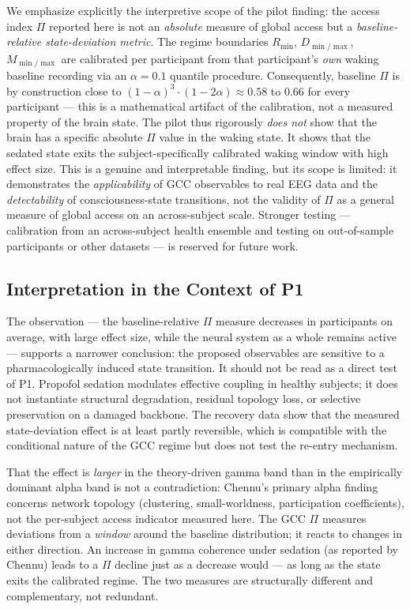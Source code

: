 ﻿\documentclass[11pt,a4paper]{article}
\theoremstyle{plain}
\theoremstyle{definition}
\theoremstyle{remark}
\begin{document}
We emphasize explicitly the interpretive scope of the pilot finding: the access index $\Pi$ reported here is not an \emph{absolute} measure of global access but a \emph{baseline-relative state-deviation metric}. The regime boundaries $R_{\min}$, $D_{\min/\max}$, $M_{\min/\max}$ are calibrated per participant from that participant's \emph{own} waking baseline recording via an $\alpha = 0.1$ quantile procedure. Consequently, baseline $\Pi$ is by construction close to $(1-\alpha)^3 \cdot (1-2\alpha) \approx 0.58$ to $0.66$ for every participant --- this is a mathematical artifact of the calibration, not a measured property of the brain state. The pilot thus rigorously \emph{does not} show that the brain has a specific absolute $\Pi$ value in the waking state. It shows that the sedated state exits the subject-specifically calibrated waking window with high effect size. This is a genuine and interpretable finding, but its scope is limited: it demonstrates the \emph{applicability} of GCC observables to real EEG data and the \emph{detectability} of consciousness-state transitions, not the validity of $\Pi$ as a general measure of global access on an across-subject scale. Stronger testing --- calibration from an across-subject health ensemble and testing on out-of-sample participants or other datasets --- is reserved for future work.

\subsection{Interpretation in the Context of P1}

The observation --- the baseline-relative $\Pi$ measure decreases in participants on average, with large effect size, while the neural system as a whole remains active --- supports a narrower conclusion: the proposed observables are sensitive to a pharmacologically induced state transition. It should not be read as a direct test of P1. Propofol sedation modulates effective coupling in healthy subjects; it does not instantiate structural degradation, residual topology loss, or selective preservation on a damaged backbone. The recovery data show that the measured state-deviation effect is at least partly reversible, which is compatible with the conditional nature of the GCC regime but does not test the re-entry mechanism.

That the effect is \emph{larger} in the theory-driven gamma band than in the empirically dominant alpha band \citep{chennu2016} is not a contradiction: Chennu's primary alpha finding concerns network topology (clustering, small-worldness, participation coefficients), not the per-subject access indicator measured here. The GCC $\Pi$ measures deviations from a \emph{window} around the baseline distribution; it reacts to changes in either direction. An increase in gamma coherence under sedation (as reported by Chennu) leads to a $\Pi$ decline just as a decrease would --- as long as the state exits the calibrated regime. The two measures are structurally different and complementary, not redundant.
\end{document}
